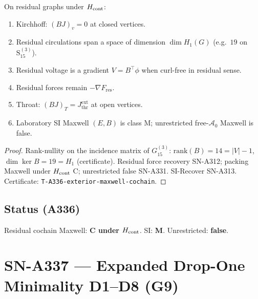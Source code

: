 \begin{theorem}
\label{thm:A336}
On residual graphs under $H_{\rm cont}$:
\begin{enumerate}[label=(\roman*)]
\item Kirchhoff: $(BJ)_v=0$ at closed vertices.
\item Residual circulations span a space of dimension $\dim H_1(G)$ (e.g.\ $19$ on $\mathrm{S}_{15}^{(3)}$).
\item Residual voltage is a gradient $V=B^\top\phi$ when curl-free in residual sense.
\item Residual forces remain $-\nabla F_{\mathrm{res}}$.
\item Throat: $(BJ)_T=J_{\mathrm{thr}}^{\mathrm{ext}}$ at open vertices.
\item Laboratory SI Maxwell $(E,B)$ is class M; unrestricted free-$\mathcal{A}_0$ Maxwell is false.
\end{enumerate}
\end{theorem}

\begin{proof}
Rank-nullity on the incidence matrix of $G_{15}^{(3)}$: $\mathrm{rank}(B)=14=|V|-1$, $\dim\ker B=19=H_1$ (certificate). Residual force recovery SN-A312; packing Maxwell under $H_{\rm cont}$ C; unrestricted false SN-A331. SI-Recover SN-A313. Certificate: \texttt{T-A336-exterior-maxwell-cochain}.
\end{proof}

\subsection*{Status (A336)}
Residual cochain Maxwell: \textbf{C under $H_{\rm cont}$}. SI: \textbf{M}. Unrestricted: \textbf{false}.

\section{SN-A337 --- Expanded Drop-One Minimality D1--D8 (G9)}
\label{sec:SN-A337}

